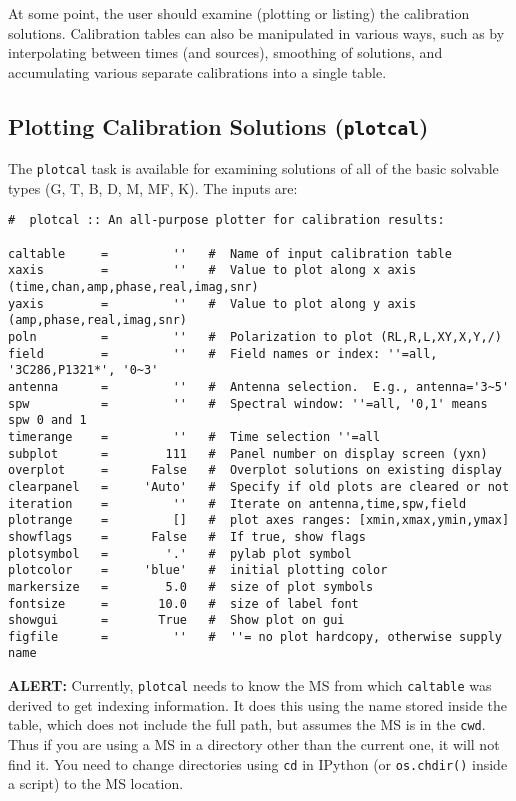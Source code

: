 {At some point, the user should examine (plotting or listing) the
calibration solutions.
Calibration tables can also be manipulated in various ways, such as
by interpolating between times (and sources), smoothing of solutions,
and accumulating various separate calibrations into a single 
table.

\subsection{Plotting Calibration Solutions ({\tt plotcal})}
\label{section:cal.tables.plotcal}

The {\tt plotcal} task is available for examining solutions of all of
the basic solvable types (G, T, B, D, M, MF, K).  The inputs are:
\small
\begin{verbatim}
#  plotcal :: An all-purpose plotter for calibration results:

caltable     =         ''   #  Name of input calibration table
xaxis        =         ''   #  Value to plot along x axis (time,chan,amp,phase,real,imag,snr)
yaxis        =         ''   #  Value to plot along y axis (amp,phase,real,imag,snr)
poln         =         ''   #  Polarization to plot (RL,R,L,XY,X,Y,/)
field        =         ''   #  Field names or index: ''=all, '3C286,P1321*', '0~3'
antenna      =         ''   #  Antenna selection.  E.g., antenna='3~5'
spw          =         ''   #  Spectral window: ''=all, '0,1' means spw 0 and 1
timerange    =         ''   #  Time selection ''=all
subplot      =        111   #  Panel number on display screen (yxn)
overplot     =      False   #  Overplot solutions on existing display
clearpanel   =     'Auto'   #  Specify if old plots are cleared or not
iteration    =         ''   #  Iterate on antenna,time,spw,field
plotrange    =         []   #  plot axes ranges: [xmin,xmax,ymin,ymax]
showflags    =      False   #  If true, show flags
plotsymbol   =        '.'   #  pylab plot symbol
plotcolor    =     'blue'   #  initial plotting color
markersize   =        5.0   #  size of plot symbols
fontsize     =       10.0   #  size of label font
showgui      =       True   #  Show plot on gui
figfile      =         ''   #  ''= no plot hardcopy, otherwise supply name
\end{verbatim}
\normalsize

{\bf ALERT:} Currently, {\tt plotcal} needs to know the MS from
which {\tt caltable} was derived to get indexing information.  It does
this using the name stored inside the table, which does not include
the full path, but assumes the MS is in the {\tt cwd}.  Thus if you
are using a MS in a directory other than the current one, it will not
find it.  You need to change directories using {\tt cd} in
IPython (or {\tt os.chdir()} inside a script) to the MS location.

}
